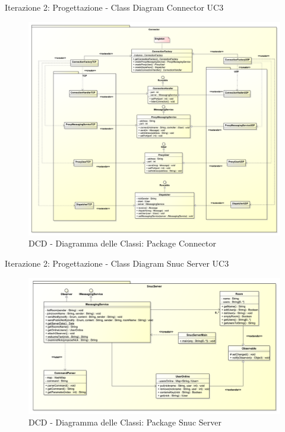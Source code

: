 \begin{frame} {Iterazione 2: Progettazione - Class Diagram Connector UC3}
   \begin{figure}
     \includegraphics[scale=0.081]{image_astah/Iteration_2_DesignModel/ClassDiagramConnector.png}{\centering}
     \caption{DCD - Diagramma delle Classi: Package Connector }
     \label{fig_UC3_DCD_4} 
   \end{figure}
\end{frame}

\begin{frame} {Iterazione 2: Progettazione - Class Diagram Snuc Server UC3}
   \begin{figure}
     \includegraphics[scale=0.155]{image_astah/Iteration_2_DesignModel/ClassDiagramSnucServer.png}{\centering}
     \caption{DCD - Diagramma delle Classi: Package Snuc Server }
     \label{fig_UC3_DCD_2} 
   \end{figure}
\end{frame}

